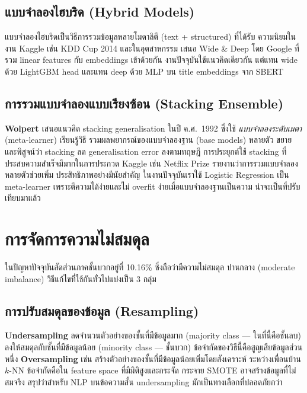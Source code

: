 \subsection{แบบจำลองไฮบริด (Hybrid Models)}

แบบจำลองไฮบริดเป็นวิธีการรวมข้อมูลหลายโมดาลิตี (text + structured) ที่ได้รับ
ความนิยมในงาน Kaggle เช่น KDD Cup 2014 และในอุตสาหกรรม \textcite{cheng2016widedeep} เสนอ Wide \& Deep โดย Google ที่รวม linear features
กับ embeddings เข้าด้วยกัน งานปัจจุบันใช้แนวคิดเดียวกัน แต่แทน wide ด้วย
LightGBM head และแทน deep ด้วย MLP บน title embeddings จาก SBERT

\subsection{การรวมแบบจำลองแบบเรียงซ้อน (Stacking Ensemble)}

\textbf{Wolpert \cite{wolpert1992stacked}} เสนอแนวคิด stacking generalisation
ในปี ค.ศ.\ 1992 ซึ่งใช้ \emph{แบบจำลองระดับเมตา} (meta-learner) เรียนรู้วิธี
รวมผลพยากรณ์ของแบบจำลองฐาน (base models) หลายตัว \textcite{breiman1996stacked}
ขยายและพิสูจน์ว่า stacking ลด generalisation error ลงตามทฤษฎี การประยุกต์ใช้
stacking ที่ประสบความสำเร็จมีมากในการประกวด Kaggle เช่น Netflix Prize
\textcite{bell2007lessons} รายงานว่าการรวมแบบจำลองหลายตัวช่วยเพิ่ม
ประสิทธิภาพอย่างมีนัยสำคัญ ในงานปัจจุบันเราใช้ Logistic Regression เป็น
meta-learner เพราะตีความได้ง่ายและไม่ overfit ง่ายเมื่อแบบจำลองฐานเป็นความ
น่าจะเป็นที่ปรับเทียบมาแล้ว

\section{การจัดการความไม่สมดุล}
\label{sec:lit-imbalance}

ในปัญหาปัจจุบันสัดส่วนภาคชั้นบวกอยู่ที่ 10.16\% ซึ่งถือว่ามีความไม่สมดุล
ปานกลาง (moderate imbalance) วิธีแก้ไขที่ใช้กันทั่วไปแบ่งเป็น 3 กลุ่ม

\subsection{การปรับสมดุลของข้อมูล (Resampling)}

\textbf{Undersampling} ลดจำนวนตัวอย่างของชั้นที่มีข้อมูลมาก (majority class —
ในที่นี้คือชั้นลบ) ลงให้สมดุลกับชั้นที่มีข้อมูลน้อย (minority class — ชั้นบวก)
ข้อจำกัดของวิธีนี้คือสูญเสียข้อมูลส่วนหนึ่ง \textbf{Oversampling} เช่น \textcite{chawla2002smote} สร้างตัวอย่างของชั้นที่มีข้อมูลน้อยเพิ่มโดยสังเคราะห์
ระหว่างเพื่อนบ้าน $k$-NN ข้อจำกัดคือใน feature space ที่มีมิติสูงและกระจัด
กระจาย SMOTE อาจสร้างข้อมูลที่ไม่สมจริง \textcite{he2009learning}
สรุปว่าสำหรับ NLP บนข้อความสั้น undersampling มักเป็นทางเลือกที่ปลอดภัยกว่า

